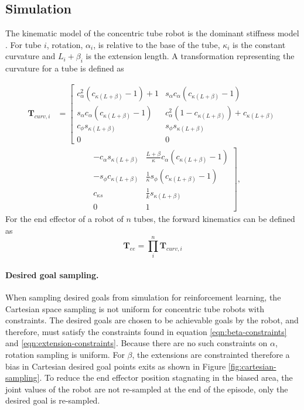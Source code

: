 \subsection{Simulation}
The kinematic model of the concentric tube robot is the dominant stiffness model \cite{Dupont2010}. For tube $i$, rotation, $\alpha_i$, is relative to the base of the tube, $\kappa_i$ is the constant curvature and $L_i + \beta_i$ is the extension length. A transformation representing the curvature for a tube is defined as

\begin{equation}\label{eqn:curvature-transformation}
\begin{aligned}
\textbf{T}_{curv,i} &=
\left[\begin{matrix}
  c^2_\alpha (c_{\kappa  \left(L+\beta\right)} - 1) + 1 & s_\alpha c_\alpha (c_{\kappa  \left(L+\beta\right)} - 1) \\
  s_\alpha c_\alpha (c_{\kappa  \left(L+\beta\right)} - 1) & c^2_\alpha (1 - c_{\kappa  \left(L+\beta\right)}) + c_{\kappa  \left(L+\beta\right)} \\
  c_{\phi} s_{\kappa  \left(L+\beta\right)} & s_{\phi} s_{\kappa  \left(L+\beta\right)} \\
  0 & 0
\end{matrix}\right.\\
&\qquad\qquad
\left.\begin{matrix}
  - c_\alpha s_{\kappa  \left(L+\beta\right)}  & \frac{L+\beta}{\kappa} c_\alpha (c_{\kappa \left(L+\beta\right)} - 1) \\
  - s_\phi c_{\kappa \left(L+\beta\right)} & \frac{1}{\kappa} s_\phi (c_{\kappa  \left(L+\beta\right)} - 1) \\
  c_{\kappa s} & \frac{1}{k} s_{\kappa  \left(L+\beta\right)} \\
  0 & 1
\end{matrix}\right],
\end{aligned}
\end{equation}
For the end effector of a robot of $n$ tubes, the forward kinematics can be defined as
\begin{equation}
\textbf{T}_{ee} = \prod^{n}_{i} \textbf{T}_{curv,i} \label{eqn:end-effector-transformation}
\end{equation}

\paragraph{Desired goal sampling.} When sampling desired goals from simulation for reinforcement learning, the Cartesian space sampling is not uniform for concentric tube robots with constraints. The desired goals are chosen to be achievable goals by the robot, and therefore, must satisfy the constraints found in equation \ref{eqn:beta-constraints} and \ref{eqn:extension-constraints}. Because there are no such constraints on $\alpha$, rotation sampling is uniform. For $\beta$, the extensions are constrainted therefore a bias in Cartesian desired goal points exits as shown in Figure \ref{fig:cartesian-sampling}. To reduce the end effector position stagnating in the biased area, the joint values of the robot are not re-sampled at the end of the episode, only the desired goal is re-sampled.

